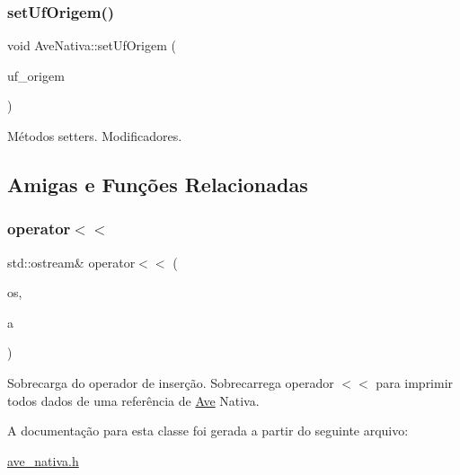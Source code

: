 \subsubsection{\texorpdfstring{set\+Uf\+Origem()}{setUfOrigem()}}
{\footnotesize\ttfamily void Ave\+Nativa\+::set\+Uf\+Origem (\begin{DoxyParamCaption}\item[{std\+::string}]{uf\+\_\+origem }\end{DoxyParamCaption})}

Métodos setters. Modificadores. 

\subsection{Amigas e Funções Relacionadas}
\mbox{\label{classAveNativa_ac527e4db529c8efbbd1ba28bc72eede7}} 
\subsubsection{\texorpdfstring{operator$<$$<$}{operator<<}}
{\footnotesize\ttfamily std\+::ostream\& operator$<$$<$ (\begin{DoxyParamCaption}\item[{std\+::ostream \&}]{os,  }\item[{\hyperlink{classAveNativa}{Ave\+Nativa} \&}]{a }\end{DoxyParamCaption})\hspace{0.3cm}{\ttfamily [friend]}}

Sobrecarga do operador de inserção. Sobrecarrega operador $<$$<$ para imprimir todos dados de uma referência de \hyperlink{classAve}{Ave} Nativa. 

A documentação para esta classe foi gerada a partir do seguinte arquivo\+:\begin{DoxyCompactItemize}
\item 
\hyperlink{ave__nativa_8h}{ave\+\_\+nativa.\+h}\end{DoxyCompactItemize}
